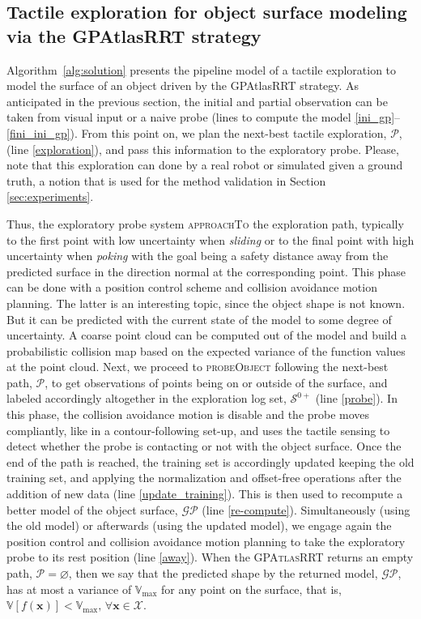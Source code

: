 \subsection{Tactile exploration for object surface modeling via the GPAtlasRRT strategy}
\label{sec:gpatlasrrt_tactile_exploration}

Algorithm~\ref{alg:solution} presents the pipeline model of a tactile exploration to model the surface of an object driven by the GPAtlasRRT strategy. As anticipated in the previous section, the initial and partial observation can be taken from visual input or a naive probe (lines to compute the model \ref{ini_gp}--\ref{fini_ini_gp}). From this point on, we plan the next-best tactile exploration, $\mathcal{P}$, (line \ref{exploration}), and pass this information to the exploratory probe. Please, note that this exploration can done by a real robot or simulated given a ground truth, a notion that is used for the method validation in Section \ref{sec:experiments}.

Thus, the exploratory probe system \textsc{approachTo} the exploration path, typically to the first point with low uncertainty when \emph{sliding} or to the final point with high uncertainty when \emph{poking} with the goal being a safety distance away from the predicted surface in the direction normal at the corresponding point. This phase can be done with a position control scheme and collision avoidance motion planning. The latter is an interesting topic, since the object shape is not known. But it can be predicted with the current state of the model to some degree of uncertainty. A coarse point cloud can be computed out of the model and build a probabilistic collision map based on the expected variance of the function values at the point cloud. Next, we proceed to \textsc{probeObject} following the next-best path, $\mathcal{P}$, to get observations of points being on or outside of the surface, and labeled accordingly altogether in the exploration log set, $\mathcal{S}^{0+}$ (line \ref{probe}). In this phase, the collision avoidance motion is disable and the probe moves compliantly, like in a contour-following set-up, and uses the tactile sensing to detect whether the probe is contacting or not with the object surface. Once the end of the path is reached, the training set is accordingly updated keeping the old training set, and applying the normalization and offset-free operations after the addition of new data (line \ref{update_training}). This is then used to recompute a better model of the object surface, $\mathcal{GP}$ (line \ref{re-compute}). Simultaneously (using the old model) or afterwards (using the updated model), we engage again the position control and collision avoidance motion planning to take the exploratory probe to its rest position (line \ref{away}). When the \textsc{GPAtlasRRT} returns an empty path, $\mathcal{P} = \varnothing$, then we say that the predicted shape by the returned model, $\mathcal{GP}$, has at most a variance of $\mathbb{V}_{\max}$ for any point on the surface, that is, $\mathbb{V}[f(\mathbf{x})] < \mathbb{V}_{\max}, \, \forall \mathbf{x} \in \mathcal{X}$.

